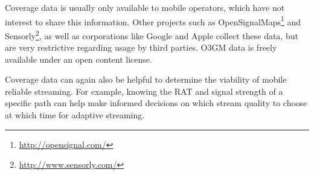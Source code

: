 Coverage data is usually only available to mobile operators, which have not interest to share this information. Other projects such as OpenSignalMaps\footnote{\url{http://opensignal.com/}} and Sensorly\footnote{\url{http://www.sensorly.com/}}, as well as corporations like Google and Apple collect these data, but are very restrictive regarding usage by third parties. \gls{O3GM} data is freely available under an open content license.

Coverage data can again also be helpful to determine the viability of mobile reliable streaming. For example, knowing the \gls{RAT} and signal strength of a specific path can help make informed decisions on which stream quality to choose at which time for adaptive streaming.











